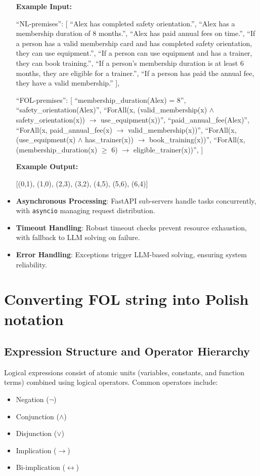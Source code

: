 \documentclass[11pt]{article}
\begin{document}
\begin{itemize}
\begin{tcolorbox}[
  colback=gray!10,
  colframe=black,
  title=Few-shot for fixing order of NL and FOL premises
  fonttitle=\bfseries,
  breakable
]

\textbf{Example Input:}

``NL-premises'': [
    ``Alex has completed safety orientation.'',
    ``Alex has a membership duration of 8 months.'',
    ``Alex has paid annual fees on time.'',
    ``If a person has a valid membership card and has completed safety orientation, they can use equipment.'',
    ``If a person can use equipment and has a trainer, they can book training.'',
    ``If a person’s membership duration is at least 6 months, they are eligible for a trainer.'',
    ``If a person has paid the annual fee, they have a valid membership.''
],

``FOL-premises'': [
    ``membership\_duration(Alex) = 8'',
    ``safety\_orientation(Alex)'',
    ``ForAll(x, (valid\_membership(x) $\land$ safety\_orientation(x)) $\to$ use\_equipment(x))'',
    ``paid\_annual\_fee(Alex)'',
    ``ForAll(x, paid\_annual\_fee(x) $\to$ valid\_membership(x))'',
    ``ForAll(x, (use\_equipment(x) $\land$ has\_trainer(x)) $\to$ book\_training(x))'',
    ``ForAll(x, (membership\_duration(x) $\geq$ 6) $\to$ eligible\_trainer(x))'',
]

\textbf{Example Output:}

[(0,1), (1,0), (2,3), (3,2), (4,5), (5,6), (6,4)]

\end{tcolorbox}
    
    \item \textbf{Asynchronous Processing}: FastAPI sub-servers handle tasks concurrently, with \texttt{asyncio} managing request distribution.
    \item \textbf{Timeout Handling}: Robust timeout checks prevent resource exhaustion, with fallback to LLM solving on failure.
    \item \textbf{Error Handling}: Exceptions trigger LLM-based solving, ensuring system reliability.
\end{itemize}

\section{Converting FOL string into Polish notation}

\subsection{Expression Structure and Operator Hierarchy}
Logical expressions consist of atomic units (variables, constants, and function terms) combined using logical operators. Common operators include:
\begin{itemize}
    \item Negation ($\neg$)
    \item Conjunction ($\land$)
    \item Disjunction ($\lor$)
    \item Implication ($\rightarrow$)
    \item Bi-implication ($\leftrightarrow$)
\end{itemize}
\end{document}
